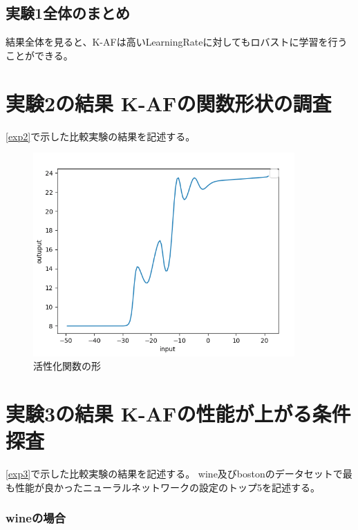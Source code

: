 \subsection{実験1全体のまとめ}
結果全体を見ると、K-AFは高いLearningRateに対してもロバストに学習を行うことができる。



\section{実験2の結果 K-AFの関数形状の調査}
\label{evo2}
\ref{exp2}で示した比較実験の結果を記述する。


\begin{figure}[hbtp]
    \begin{center}
        \includegraphics[width=10cm]{asset/boston_0000001_SGDkaiming_normal__non_200_function_2.png}
            \caption{活性化関数の形}
            \label{boston}
    \end{center}
\end{figure}


\section{実験3の結果 K-AFの性能が上がる条件探査}
\label{evo3}
\ref{exp3}で示した比較実験の結果を記述する。
wine及びbostonのデータセットで最も性能が良かったニューラルネットワークの設定のトップ5を記述する。

\subsubsection{wineの場合}

